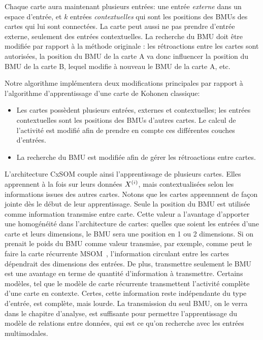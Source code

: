 Chaque carte aura maintenant plusieurs entrées: une entrée \emph{externe} dans un espace d'entrée, et $k$ entrées \emph{contextuelles} qui sont les positions des BMUs des cartes qui lui sont connectées. La carte peut aussi ne pas prendre d'entrée externe, seulement des entrées contextuelles.
La recherche du BMU doit être modifiée par rapport à la méthode originale : les rétroactions entre les cartes sont autorisées, la position du BMU de la carte A va donc influencer la position du BMU de la carte B, lequel modifie à nouveau le BMU de la carte A, etc. 

Notre algorithme implémentera deux modifications principales par rapport à l'algorithme d'apprentissage d'une carte de Kohonen classique: 
\begin{itemize}
\item Les cartes possèdent plusieurs entrées, externes et contextuelles; les entrées contextuelles sont les positions des BMUs d'autres cartes. Le calcul de l'activité est modifié afin de prendre en compte ces différentes couches d'entrées.
\item La recherche du BMU est modifiée afin de gérer les rétroactions entre cartes.
\end{itemize}

L'architecture CxSOM couple ainsi l'apprentissage de plusieurs cartes. Elles apprennent à la fois sur leurs données $X^{({i})}$, mais contextualisées selon les informations issues des autres cartes. Notons que les cartes apprennnent de façon jointe dès le début de leur apprentissage. Seule la position du BMU est utilisée comme information transmise entre carte. Cette valeur a l'avantage d'apporter une homogénéité dans l'architecture de cartes: quelles que soient les entrées d'une carte et leurs dimensions, le BMU sera une position en 1 ou 2 dimensions. Si on prenait le poids du BMU comme valeur transmise, par exemple, comme peut le faire la carte récurrente MSOM~\cite{Strickert2005MergeSF}, l'information circulant entre les cartes dépendrait des dimensions des entrées.
De plus, transmettre seulement le BMU est une avantage en terme de quantité d'information à transmettre. Certains modèles, tel que le modèle de carte récurrente \cite{Voegtlin2002RecursiveSM} transmettent l'activité complète d'une carte en contexte. Certes, cette information reste indépendante du type d'entrée, est complète, mais lourde. La transmission du seul BMU, on le verra dans le chapitre d'analyse, est suffisante pour permettre l'apprentissage du modèle de relations entre données, qui est ce qu'on recherche avec les entrées multimodales. 

